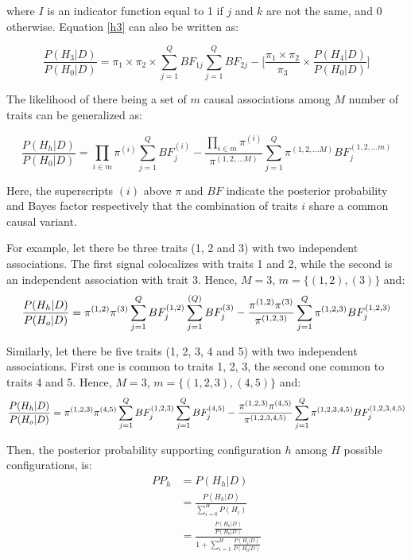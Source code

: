 \documentclass{article}
\begin{document}
\noindent where $I$ is an indicator function equal to 1 if $j$ and $k$ are not the same, and 0 otherwise. Equation \ref{h3} can also be written as:

\begin{equation}
\frac{P(H_3|D)}{P(H_0|D)} = \pi_1 \times \pi_2 \times \sum_{j=1}^Q BF_{1j} \sum_{j=1}^Q BF_{2j} - \bigg[\frac{\pi_1 \times \pi_2}{\pi_3} \times \frac{P(H_4|D)}{P(H_0|D)} \bigg]
\end{equation}

\noindent The likelihood of there being a set of $m$ causal associations among $M$ number of traits can be generalized as:

\begin{equation}
\frac{P(H_h|D)}{P(H_0|D)} = \prod_{i \in m} \pi^{(i)} \sum_{j=1}^Q BF_j^{(i)} - \frac{\prod_{i \in m} \pi^{(i)}}{\pi^{(1,2,...M)}} \sum_{j=1}^Q \pi^{(1,2,...M)} BF_j^{(1,2,...m)}
\end{equation}

\noindent Here, the superscripts $(i)$ above $\pi$ and $BF$ indicate the posterior probability and Bayes factor respectively that the combination of traits $i$ share a common causal variant.

For example, let there be three traits (1, 2 and 3) with two independent associations. The first signal colocalizes with traits 1 and 2, while the second is an independent association with trait 3. Hence, $M = 3$, $m = \big\{(1,2),(3)\big\}$ and:
\begin{equation}
\frac{P(H_h|D)}{P(H_o|D)} = \pi^{(1,2)} \pi^{(3)} \sum_{j=1}^{Q} BF_j^{(1,2)} \sum_{j=1}^{(Q)} BF_j^{(3)} - \frac{\pi^{(1,2)} \pi^{(3)}}{\pi^{(1,2,3)}} \sum_{j=1}^Q \pi^{(1,2,3)} BF_j^{(1,2,3)}\\
\end{equation}

\noindent Similarly, let there be five traits (1, 2, 3, 4 and 5) with two independent associations. First one is common to traits 1, 2, 3, the second one common to traits 4 and 5. Hence, $M = 3$, $m = \big\{(1,2,3),(4,5)\}$ and:
\begin{equation}
\frac{P(H_h|D)}{P(H_o|D)} = \pi^{(1,2,3)} \pi^{(4,5)} \sum_{j=1}^{Q} BF_j^{(1,2,3)} \sum_{j=1}^{Q} BF_j^{(4,5)} - \frac{\pi^{(1,2,3)} \pi^{(4,5)} }{\pi^{(1,2,3,4,5)}} \sum_{j=1}^Q \pi^{(1,2,3,4,5)} BF_j^{(1,2,3,4,5)}\\
\end{equation}

Then, the posterior probability supporting configuration $h$ among $H$ possible configurations, is:
\begin{align}
PP_h &= P(H_h | D) \\
&= \frac{P(H_h | D)}{\sum_{i=0}^H P(H_i)} \\
&= \frac{\frac{P(H_h | D)}{P(H_0|D)}}{1 + \sum_{i=1}^H \frac{P(H_i|D)}{P(H_0|D)}}
\end{align}
\end{document}
